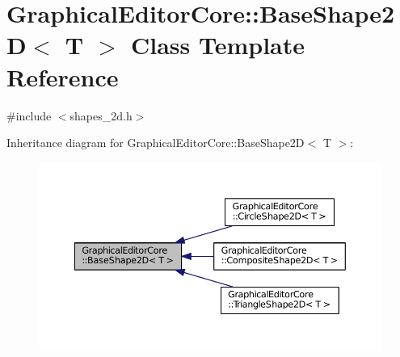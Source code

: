 \hypertarget{classGraphicalEditorCore_1_1BaseShape2D}{}\section{Graphical\+Editor\+Core\+:\+:Base\+Shape2D$<$ T $>$ Class Template Reference}
\label{classGraphicalEditorCore_1_1BaseShape2D}


{\ttfamily \#include $<$shapes\+\_\+2d.\+h$>$}



Inheritance diagram for Graphical\+Editor\+Core\+:\+:Base\+Shape2D$<$ T $>$\+:
\nopagebreak
\begin{figure}[H]
\begin{center}
\leavevmode
\includegraphics[width=350pt]{classGraphicalEditorCore_1_1BaseShape2D__inherit__graph}
\end{center}
\end{figure}
